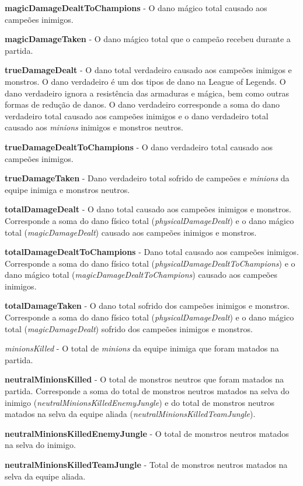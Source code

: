 \textbf{magicDamageDealtToChampions} - O dano mágico total causado aos campeões inimigos.

\textbf{magicDamageTaken} - O dano mágico total que o campeão recebeu durante a partida.

\textbf{trueDamageDealt} - O dano total verdadeiro causado aos campeões inimigos e monstros. O dano verdadeiro é um dos tipos de dano na League of Legends. O dano verdadeiro ignora a resistência das armaduras e mágica, bem como outras formas de redução de danos. O dano verdadeiro corresponde a soma do dano verdadeiro total causado aos campeões inimigos e o dano verdadeiro total causado aos \textit{minions} inimigos e monstros neutros.

\textbf{trueDamageDealtToChampions} - O dano verdadeiro total causado aos campeões inimigos.

\textbf{trueDamageTaken} - Dano verdadeiro total sofrido de campeões e \textit{minions} da equipe inimiga e monstros neutros.

\textbf{totalDamageDealt} - O dano total causado aos campeões inimigos e monstros. Corresponde a soma do dano físico total (\textit{physicalDamageDealt}) e o dano mágico total (\textit{magicDamageDealt}) causado aos campeões inimigos e monstros.

\textbf{totalDamageDealtToChampions} - Dano total causado aos campeões inimigos. Corresponde a soma do dano físico total (\textit{physicalDamageDealtToChampions}) e o dano mágico total (\textit{magicDamageDealtToChampions}) causado aos campeões inimigos.

\textbf{totalDamageTaken} - O dano total sofrido dos campeões inimigos e monstros. Corresponde a soma do dano físico total (\textit{physicalDamageDealt}) e o dano mágico total (\textit{magicDamageDealt}) sofrido dos campeões inimigos e monstros.

\textit{minionsKilled} - O total de \textit{minions} da equipe inimiga que foram matados na partida.

\textbf{neutralMinionsKilled} - O total de monstros neutros que foram matados na partida. Corresponde a soma do total de monstros neutros matados na selva do inimigo (\textit{neutralMinionsKilledEnemyJungle}) e do total de monstros neutros matados na selva da equipe aliada (\textit{neutralMinionsKilledTeamJungle}).

\textbf{neutralMinionsKilledEnemyJungle} - O total de monstros neutros matados na selva do inimigo.

\textbf{neutralMinionsKilledTeamJungle} - Total de monstros neutros matados na selva da equipe aliada.

